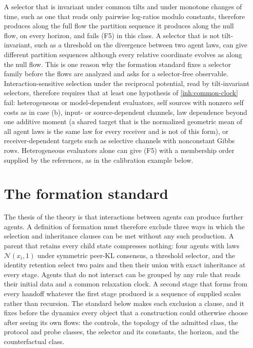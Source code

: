 A selector that is invariant under common tilts and under monotone changes
of time, such as one that reads only pairwise log-ratios modulo constants,
therefore produces along the full flow the partition sequence it produces
along the null flow, on every horizon, and fails (F5) in this class. A
selector that is not tilt-invariant, such as a threshold on the divergence
between two agent laws, can give different partition sequences although
every relative coordinate evolves as along the null flow. This is one reason
why the formation standard fixes a selector family before the flows are
analyzed and asks for a selector-free observable. Interaction-sensitive
selection under the reciprocal potential, read by tilt-invariant selectors,
therefore requires that at least one hypothesis of \cref{inh:common-clock}
fail: heterogeneous or model-dependent evaluators, self sources with nonzero
self costs as in case (b), input- or source-dependent channels, law
dependence beyond one additive moment (a shared target that is the
normalized geometric mean of all agent laws is the same law for every
receiver and is not of this form), or receiver-dependent targets such as
selective channels with nonconstant Gibbs rows. Heterogeneous evaluators
alone can give (F5) with a membership order supplied by the references, as
in the calibration example below.

\section{The formation standard}

The thesis of the theory is that interactions between agents can produce
further agents. A definition of formation must therefore exclude three ways
in which the selection and inheritance clauses can be met without any such
production. A parent that retains every child state compresses nothing:
four agents with laws $\mathcal N(x_i,1)$ under symmetric peer-KL consensus,
a threshold selector, and the identity retention select two pairs and then
their union with exact inheritance at every stage. Agents that do not
interact can be grouped by any rule that reads their initial data and a
common relaxation clock. A second stage that forms from every handoff
whatever the first stage produced is a sequence of supplied scales rather
than recursion. The standard below makes each exclusion a clause, and it
fixes before the dynamics every object that a construction could otherwise
choose after seeing its own flows: the controls, the topology of the
admitted class, the protocol and probe classes, the selector and its
constants, the horizon, and the counterfactual class.

